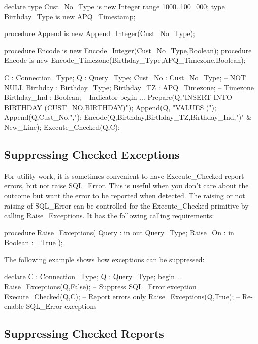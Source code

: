 \documentclass[english,letterpaper]{book}
\begin{document}
\begin{Example}
declare
   type Cust_No_Type is new Integer range 1000..100_000;
   type Birthday_Type is new APQ_Timestamp;

   procedure Append is new Append_Integer(Cust_No_Type);

   procedure Encode is new
      Encode_Integer(Cust_No_Type,Boolean);
   procedure Encode is new
      Encode_Timezone(Birthday_Type,APQ_Timezone,Boolean);

   C :            Connection_Type;
   Q :            Query_Type;
   Cust_No :      Cust_No_Type;     -- NOT NULL
   Birthday :     Birthday_Type;
   Birthday_TZ :  APQ_Timezone;     -- Timezone
   Birthday_Ind : Boolean;          -- Indicator
begin
   ...
   Prepare(Q,"INSERT INTO BIRTHDAY (CUST_NO,BIRTHDAY)");
   Append(Q, "VALUES (");
   Append(Q,Cust_No,",");
   Encode(Q,Birthday,Birthday_TZ,Birthday_Ind,")" & New_Line);
   Execute_Checked(Q,C);
\end{Example}


\subsection{Suppressing Checked Exceptions}

For utility work, it is sometimes convenient to have Execute\_Checked
report errors, but not raise SQL\_Error. This is useful when you don't
care about the outcome but want the error to be reported when detected.
The raising or not raising of SQL\_Error can be controlled for the
Execute\_Checked primitive by calling
Raise\_Exceptions. It has the following calling
requirements:

\begin{Code}
procedure Raise_Exceptions(
   Query :    in out Query_Type;
   Raise_On : in     Boolean := True
);
\end{Code}

The following example shows how exceptions can be suppressed:

\begin{Example}
declare
   C : Connection_Type;
   Q : Query_Type;
begin
   ...
   Raise_Exceptions(Q,False); -- Suppress SQL_Error exception
   Execute_Checked(Q,C);      -- Report errors only
   Raise_Exceptions(Q,True);  -- Re-enable SQL_Error exceptions
\end{Example}

\subsection{Suppressing Checked Reports}
\end{document}
